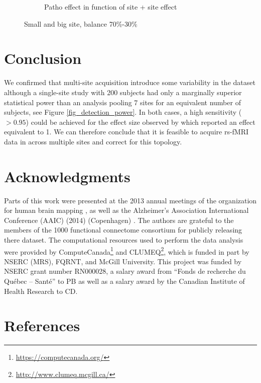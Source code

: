 \documentclass[authoryear]{elsarticle}
\begin{document}
\begin{figure}
\begin{subfigure}[b]{0.475\textwidth}
            {{\tiny Patho effect in function of site + site effect}}    
            \label{fig:2080 bal7030 var2 site05}
        \end{subfigure}
        \caption[]
        {\small Small and big site, balance 70\%-30\%} 
        \label{fig:mean and std of nets}
    \end{figure}

\section{Conclusion}

We confirmed that multi-site acquisition introduce some variability in the dataset although a single-site study with 200 subjects had only a marginally superior statistical power than an analysis pooling 7 sites for an equivalent number of subjects, see Figure \ref{fig_detection_power}. In both cases, a high sensitivity ($>0.95$) could be achieved for the effect size observed by \cite{Goveas2011} which reported an effect equivalent to 1. We can therefore conclude that it is feasible to acquire rs-fMRI data in across multiple sites and correct for this topology.





\section{Acknowledgments}
Parts of this work were presented at the 2013 annual meetings of the organization for human brain mapping \citep{Dansereau2013}, as well as the  Alzheimer's Association International Conference (AAIC) (2014) (Copenhagen) \citep{Dansereau2014}. The authors are grateful to the members of the 1000 functional connectome consortium for publicly releasing there dataset. The computational resources used to perform the data analysis were provided by ComputeCanada\footnote{\url{https://computecanada.org/}} and CLUMEQ\footnote{\url{http://www.clumeq.mcgill.ca/}}, which is funded in part by NSERC (MRS), FQRNT, and McGill University. This project was funded by NSERC grant number RN000028, a salary award from ``Fonds de recherche du Qu\'ebec -- Sant\'e'' to PB as well as a salary award by the Canadian Institute of Health Research to CD.

\section*{References}
\end{document}
